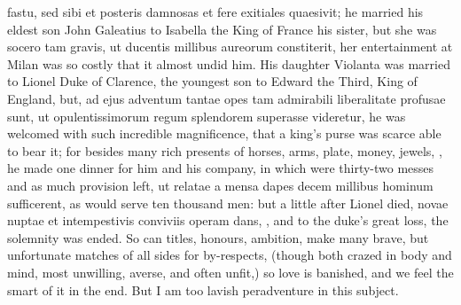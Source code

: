 fastu, sed sibi et posteris damnosas et fere exitiales quaesivit; he
married his eldest son John Galeatius to Isabella the King of France
his sister, but she was socero tam gravis, ut ducentis millibus
aureorum constiterit, her entertainment at Milan was so costly that it
almost undid him. His daughter Violanta was married to Lionel Duke of
Clarence, the youngest son to Edward the Third, King of England, but,
ad ejus adventum tantae opes tam admirabili liberalitate profusae sunt,
ut opulentissimorum regum splendorem superasse videretur, he was
welcomed with such incredible magnificence, that a king's purse was
scarce able to bear it; for besides many rich presents of horses, arms,
plate, money, jewels, \etc{}, he made one dinner for him and his company,
in which were thirty-two messes and as much provision left, ut relatae
a mensa dapes decem millibus hominum sufficerent, as would serve ten
thousand men: but a little after Lionel died, novae nuptae et
intempestivis conviviis operam dans, \etc{}, and to the duke's great loss,
the solemnity was ended. So can titles, honours, ambition, make many
brave, but unfortunate matches of all sides for by-respects, (though
both crazed in body and mind, most unwilling, averse, and often unfit,)
so love is banished, and we feel the smart of it in the end. But I am
too lavish peradventure in this subject.

